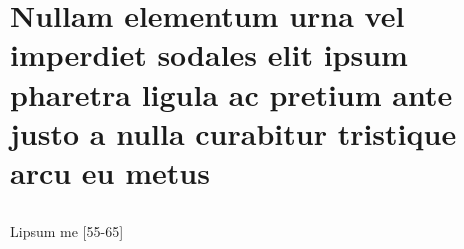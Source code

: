 


\chapter[Nullam elementum urna vel imperdiet]{Nullam elementum urna vel imperdiet sodales elit ipsum pharetra ligula
    ac pretium ante justo a nulla curabitur tristique arcu eu metus}

\showfont
\section[Some encoding tests]{\showfont}
\subsection{\showfont}
\subsubsection{\showfont}
\subsubsubsection{\showfont}



Lipsum me [55-65]


